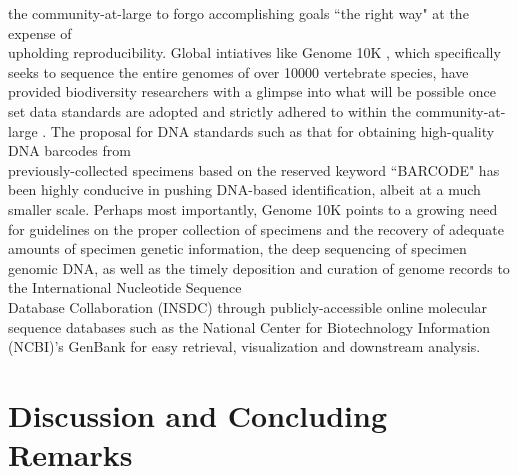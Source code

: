 the community-at-large to forgo accomplishing goals ``the right way" at the expense of \\ upholding reproducibility. Global intiatives like Genome 10K \cite{G10KCOS2009genome, koepfli2015genome}, which specifically seeks to sequence the entire genomes of over 10000 vertebrate species, have provided biodiversity researchers with a glimpse into what will be possible once set data standards are adopted and strictly adhered to within the community-at-large \cite{koepfli2015genome}. The proposal for DNA standards such as that for obtaining high-quality DNA barcodes from \\ previously-collected specimens based on the reserved keyword ``BARCODE" \cite{hanner2009data} has been highly conducive in pushing DNA-based identification, albeit at a much smaller scale. Perhaps most importantly, Genome 10K points to a growing need for guidelines on the proper collection of specimens and the recovery of adequate amounts of specimen genetic information, the deep sequencing of specimen genomic DNA, as well as the timely deposition and curation of genome records to the International Nucleotide Sequence \\ Database Collaboration (INSDC) through publicly-accessible online molecular sequence databases such as the National Center for Biotechnology Information (NCBI)'s GenBank for easy retrieval, visualization and downstream analysis. 
 



\section{Discussion and Concluding Remarks}


